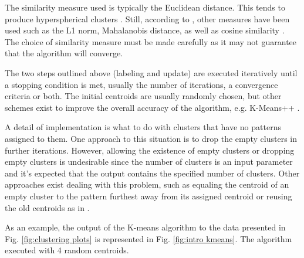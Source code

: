The similarity measure used is typically the Euclidean distance.
This tends to produce hyperspherical clusters \cite{Jain1999}.
Still, according to \cite{Jain2010}, other measures have been used such as the L1 norm, Mahalanobis distance, as well as cosine similarity \cite{Aggarwal2014}.
The choice of similarity measure must be made carefully as it may not guarantee that the algorithm will converge.

The two steps outlined above (labeling and update) are executed iteratively until a stopping condition is met, usually the number of iterations, a convergence criteria or both.
The initial centroids are usually randomly chosen, but other schemes exist to improve the overall accuracy of the algorithm, e.g. K-Means++ \cite{Arthur2007}.

A detail of implementation is what to do with clusters that have no patterns assigned to them.
One approach to this situation is to drop the empty clusters in further iterations.
However, allowing the existence of empty clusters or dropping empty clusters is undesirable since the number of clusters is an input parameter and it's expected that the output contains the specified number of clusters.
Other approaches exist dealing with this problem, such as equaling the centroid of an empty cluster to the pattern furthest away from its assigned centroid or reusing the old centroids as in \cite{Pakhira2009}.




As an example, the output of the K-means algorithm to the data presented in Fig. \ref{fig:clustering plots} is represented in Fig. \ref{fig:intro kmeans}.
The algorithm executed with 4 random centroids.

